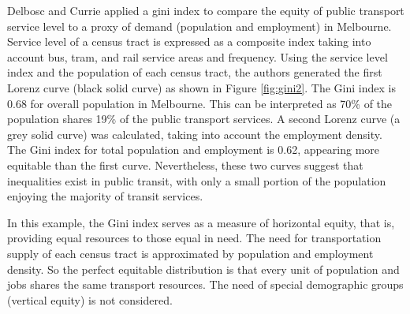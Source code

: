 \documentclass[11pt]{article}
\begin{document}

Delbosc and Currie applied a gini index to compare the equity of public transport service level to a proxy of demand (population and employment) in Melbourne. Service level of a census tract is expressed as a composite index taking into account bus, tram, and rail service areas and frequency. Using the service level index and the population of each census tract, the authors generated the first Lorenz curve (black solid curve) as shown in Figure \ref{fig:gini2}. The Gini index is 0.68 for overall population in Melbourne. This can be interpreted as 70\% of the population shares 19\% of the public transport services. A second Lorenz curve (a grey solid curve) was calculated, taking into account the employment density. The Gini index for total population and employment is 0.62, appearing more equitable than the first curve. Nevertheless, these two curves suggest that inequalities exist in public transit, with only a small portion of the population enjoying the majority of transit services. 




In this example, the Gini index serves as a measure of horizontal equity, that is,  providing equal resources to those equal in need. The need for transportation supply of each census tract is approximated by population and employment density. So the perfect equitable distribution is that every unit of population and jobs shares the same transport resources. The need of special demographic groups (vertical equity) is not considered. 
\end{document}
